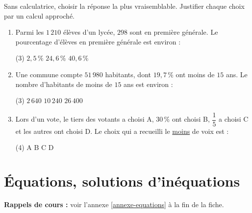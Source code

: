 \documentclass[10pt,a4paper]{article}
\begin{document}
\begin{bloc}
\begin{exo}[QCM][appro]
Sans calculatrice, choisir la réponse la plus vraisemblable. Justifier chaque choix par un calcul approché.
\begin{enumerate}[leftmargin=*]
    \item Parmi les \(1\,210\) élèves d'un lycée, \(298\) sont en première générale. Le pourcentage d'élèves en première générale est environ :
    \begin{tasks}(3)
        \task \(2,5\,\%\)
        \task \(24,6\,\%\)
        \task \(40,6\,\%\)
    \end{tasks}
    \item Une commune compte \(51\,980\) habitants, dont \(19,7\,\%\) ont moins de \(15\) ans. Le nombre d'habitants de moins de \(15\) ans est environ :
    \begin{tasks}(3)
        \task \(2\,640\)
        \task \(10\,240\)
        \task \(26\,400\)
    \end{tasks}
    \item Lors d'un vote, le tiers des votants a choisi A, \(30\,\%\) ont choisi B, \(\dfrac{1}{5}\) a choisi C et les autres ont choisi D. Le choix qui a recueilli le \underline{moins} de voix est :
    \begin{tasks}(4)
        \task A
        \task B
        \task C
        \task D
    \end{tasks}
\end{enumerate}
\end{exo}
\end{bloc}


\section{Équations, solutions d'inéquations}

\textbf{Rappels de cours :} voir l'annexe \ref{annexe-equations} à la fin de la fiche.
\nopagebreak
\end{document}
